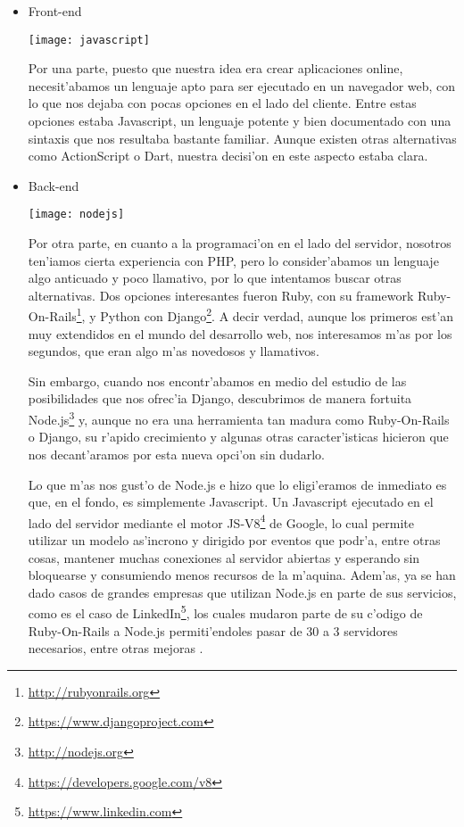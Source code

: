 \begin{itemize}
\item Front-end
\begin{center}
\texttt{[image: javascript]}
\end{center}

Por una parte, puesto que nuestra idea era crear aplicaciones online, necesit'abamos un
lenguaje apto para ser ejecutado en un navegador web, con lo que nos dejaba con pocas opciones en el lado del cliente. Entre estas
opciones estaba Javascript, un lenguaje potente y bien documentado con una sintaxis que nos resultaba bastante familiar. Aunque existen
otras alternativas como ActionScript o Dart, nuestra decisi'on en este aspecto estaba clara. 

\item Back-end
\begin{center}
\texttt{[image: nodejs]}
\end{center}

Por otra parte, en cuanto a la programaci'on en el lado del servidor, nosotros ten'iamos cierta experiencia con PHP, pero lo
consider'abamos un lenguaje algo anticuado y poco llamativo, por lo que intentamos buscar otras alternativas. Dos opciones interesantes
fueron Ruby, con su framework Ruby-On-Rails\footnote{\url{http://rubyonrails.org}}, y Python con Django\footnote{\url{https://www.djangoproject.com}}. A decir verdad, aunque los primeros est'an muy extendidos en el
mundo del desarrollo web, nos interesamos m'as por los segundos, que eran algo m'as novedosos y llamativos.

Sin embargo, cuando nos encontr'abamos en medio del estudio de las posibilidades que nos ofrec'ia Django, descubrimos de manera fortuita
Node.js\footnote{\url{http://nodejs.org}} y, aunque no era una herramienta tan madura como Ruby-On-Rails o Django, su r'apido crecimiento y algunas otras caracter'isticas
hicieron que nos decant'aramos por esta nueva opci'on sin dudarlo.

Lo que m'as nos gust'o de Node.js e hizo que lo eligi'eramos de inmediato es que, en el fondo, es simplemente Javascript. Un
Javascript ejecutado en el lado del servidor mediante el motor JS-V8\footnote{\url{https://developers.google.com/v8}} de Google, lo cual permite utilizar un modelo as'incrono y dirigido
por eventos que podr'a, entre otras cosas, mantener muchas conexiones al servidor abiertas y esperando sin bloquearse y consumiendo menos
recursos de la m'aquina. Adem'as, ya se han dado casos de grandes empresas que utilizan Node.js en parte de sus servicios, como es el caso de
LinkedIn\footnote{\url{https://www.linkedin.com}}, los cuales mudaron parte de su c'odigo de Ruby-On-Rails a Node.js permiti'endoles pasar de 30 a 3 servidores necesarios, entre otras
mejoras \cite{linkedin_nodejs} .


\end{itemize}
